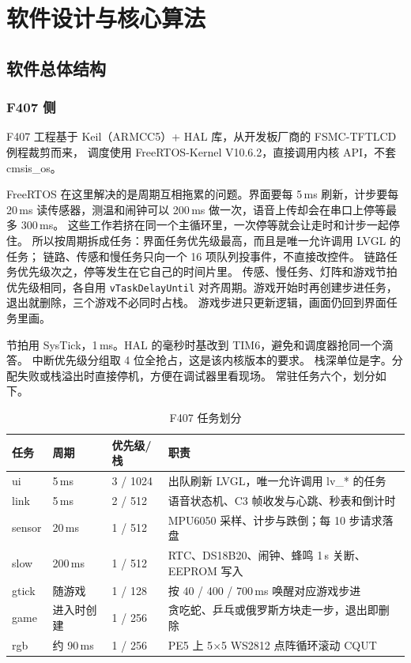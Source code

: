 \section{软件设计与核心算法}

\subsection{软件总体结构}
\subsubsection{F407 侧}
F407 工程基于 Keil（ARMCC5）+ HAL 库，从开发板厂商的 FSMC-TFTLCD 例程裁剪而来，
调度使用 FreeRTOS-Kernel V10.6.2，直接调用内核 API，不套 cmsis\_os。

FreeRTOS 在这里解决的是周期互相拖累的问题。界面要每 5\,ms 刷新，计步要每 20\,ms
读传感器，测温和闹钟可以 200\,ms 做一次，语音上传却会在串口上停等最多 300\,ms。
这些工作若挤在同一个主循环里，一次停等就会让走时和计步一起停住。
所以按周期拆成任务：界面任务优先级最高，而且是唯一允许调用 LVGL 的任务；
链路、传感和慢任务只向一个 16 项队列投事件，不直接改控件。
链路任务优先级次之，停等发生在它自己的时间片里。
传感、慢任务、灯阵和游戏节拍优先级相同，各自用 \texttt{vTaskDelayUntil}
对齐周期。游戏开始时再创建步进任务，退出就删除，三个游戏不必同时占栈。
游戏步进只更新逻辑，画面仍回到界面任务里画。

节拍用 SysTick，1\,ms。HAL 的毫秒时基改到 TIM6，避免和调度器抢同一个滴答。
中断优先级分组取 4 位全抢占，这是该内核版本的要求。
栈深单位是字。分配失败或栈溢出时直接停机，方便在调试器里看现场。
常驻任务六个，划分如下。

\begin{table}[htbp]
\centering\small
\caption{F407 任务划分}\label{tab:tasks}
\begin{tabular}{@{}llp{2.15cm}p{7.6cm}@{}}
\toprule
任务 & 周期 & 优先级/栈 & 职责\\
\midrule
ui & 5\,ms & 3 / 1024 & 出队刷新 LVGL，唯一允许调用 lv\_* 的任务\\
link & 5\,ms & 2 / 512 & 语音状态机、C3 帧收发与心跳、秒表和倒计时\\
sensor & 20\,ms & 1 / 512 & MPU6050 采样、计步与跌倒；每 10 步请求落盘\\
slow & 200\,ms & 1 / 512 & RTC、DS18B20、闹钟、蜂鸣 1\,s 关断、EEPROM 写入\\
gtick & 随游戏 & 1 / 128 & 按 40 / 400 / 700\,ms 唤醒对应游戏步进\\
game & 进入时创建 & 1 / 256 & 贪吃蛇、乒乓或俄罗斯方块走一步，退出即删除\\
rgb & 约 90\,ms & 1 / 256 & PE5 上 5$\times$5 WS2812 点阵循环滚动 CQUT\\
\bottomrule
\end{tabular}
\end{table}


